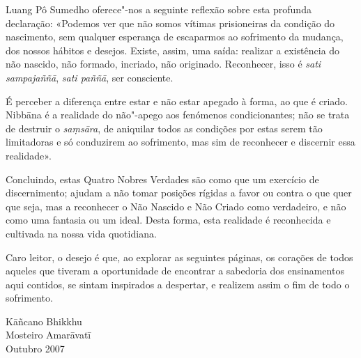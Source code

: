 Luang Pô Sumedho oferece"-nos a seguinte reflexão sobre esta profunda
declaração: «Podemos ver que não somos vítimas prisioneiras da condição do
nascimento, sem qualquer esperança de escaparmos ao sofrimento da mudança, dos
nossos hábitos e desejos. Existe, assim, uma saída: realizar a existência do não
nascido, não formado, incriado, não originado. Reconhecer, isso é \emph{sati
  sampajaññā}, \emph{sati paññā}, ser consciente.

É perceber a diferença entre
estar e não estar apegado à forma, ao que é criado. Nibbāna é a realidade do
não"-apego aos fenómenos condicionantes; não se trata de destruir o
\emph{saṃsāra}, de aniquilar todos as condições por estas serem tão limitadoras
e só conduzirem ao sofrimento, mas sim de reconhecer e discernir essa realidade».

Concluindo, estas Quatro Nobres Verdades são como que um exercício de
discernimento; ajudam a não tomar posições rígidas a favor ou contra o que quer
que seja, mas a reconhecer o Não Nascido e Não Criado como verdadeiro, e não
como uma fantasia ou um ideal. Desta forma, esta realidade é reconhecida e
cultivada na nossa vida quotidiana.

Caro leitor, o desejo é que, ao explorar as seguintes páginas, os corações de
todos aqueles que tiveram a oportunidade de encontrar a sabedoria dos
ensinamentos aqui contidos, se sintam inspirados a despertar, e
realizem assim o fim de todo o sofrimento.

\bigskip

{\raggedleft
  Kāñcano Bhikkhu\\
  Mosteiro Amarāvatī\\
  Outubro 2007
\par}

